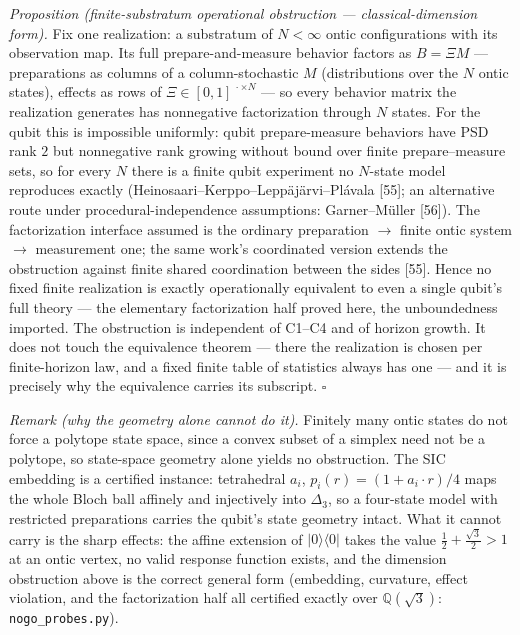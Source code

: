 \documentclass[
]{article}
\begin{document}
\emph{Proposition (finite-substratum operational obstruction ---
classical-dimension form).} Fix one realization: a substratum of
\(N < \infty\) ontic configurations with its observation map. Its full
prepare-and-measure behavior factors as \(B = \Xi M\) --- preparations
as columns of a column-stochastic \(M\) (distributions over the \(N\)
ontic states), effects as rows of \(\Xi \in [0,1]^{\,\cdot \times N}\)
--- so every behavior matrix the realization generates has nonnegative
factorization through \(N\) states. For the qubit this is impossible
uniformly: qubit prepare-measure behaviors have PSD rank \(2\) but
nonnegative rank growing without bound over finite prepare--measure
sets, so for every \(N\) there is a finite qubit experiment no
\(N\)-state model reproduces exactly
(Heinosaari--Kerppo--Leppäjärvi--Plávala {[}55{]}; an alternative route
under procedural-independence assumptions: Garner--Müller {[}56{]}). The
factorization interface assumed is the ordinary preparation \(\to\)
finite ontic system \(\to\) measurement one; the same work's coordinated
version extends the obstruction against finite shared coordination
between the sides {[}55{]}. Hence no fixed finite realization is exactly
operationally equivalent to even a single qubit's full theory --- the
elementary factorization half proved here, the unboundedness imported.
The obstruction is independent of C1--C4 and of horizon growth. It does
not touch the equivalence theorem --- there the realization is chosen
per finite-horizon law, and a fixed finite table of statistics always
has one --- and it is precisely why the equivalence carries its
subscript. \(\square\)

\emph{Remark (why the geometry alone cannot do it).} Finitely many ontic
states do not force a polytope state space, since a convex subset of a
simplex need not be a polytope, so state-space geometry alone yields no
obstruction. The SIC embedding is a certified instance: tetrahedral
\(a_i\), \(p_i(r) = (1 + a_i \cdot r)/4\) maps the whole Bloch ball
affinely and injectively into \(\Delta_3\), so a four-state model with
restricted preparations carries the qubit's state geometry intact. What
it cannot carry is the sharp effects: the affine extension of
\(|0\rangle\langle 0|\) takes the value
\(\tfrac12 + \tfrac{\sqrt3}{2} > 1\) at an ontic vertex, no valid
response function exists, and the dimension obstruction above is the
correct general form (embedding, curvature, effect violation, and the
factorization half all certified exactly over \(\mathbb{Q}(\sqrt3)\):
\texttt{nogo\_probes.py}).
\end{document}
